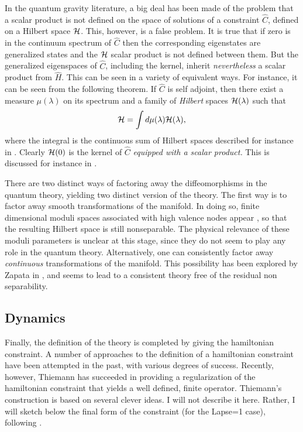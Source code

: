 \documentclass[12pt]{article}
\begin{document}
In the quantum gravity literature, a big deal has been made of 
the problem that a scalar product is not defined on the space of 
solutions of a constraint $\hat C$, defined on a Hilbert space $\cal 
H$.  This, however, is a false problem.  It is true that if zero 
is in the continuum spectrum of $\hat C$ then the corresponding 
eigenstates are generalized states and the $\cal H$ scalar 
product is not defined between them.  But the generalized 
eigenspaces of $\hat C$, including the kernel, inherit {\em 
nevertheless\/} a scalar product from $\hat H$.  This can be seen 
in a variety of equivalent ways.  For instance, it can be seen  
from the following theorem.  If $\hat C$ is self adjoint, then 
there exist a measure $\mu(\lambda)$ on its spectrum and a family 
of {\em Hilbert\/} spaces ${\cal H}(\lambda)$ such that
\begin{equation}
	{\cal H} = \int d\mu(\lambda) {\cal H}(\lambda),
\end{equation}
where the integral is the continuous sum of Hilbert spaces 
described for instance in \cite{Guichardet}. Clearly ${\cal 
H}(0)$ is the kernel of $\hat C$ {\em equipped with a scalar 
product.} This is discussed for instance in \cite{RovelliTh}. 

There are two distinct ways of factoring away the diffeomorphisms 
in the quantum theory, yielding two distinct version of the 
theory.  The first way is to factor away smooth transformations of 
the manifold.  In doing so, finite dimensional moduli spaces 
associated with high valence nodes appear 
\cite{GrottRovelli96}, so that the resulting Hilbert space is still 
nonseparable.  The physical relevance of these moduli parameters 
is unclear at this stage, since they do not seem to play any role 
in the quantum theory.  Alternatively, one can consistently 
factor away {\em continuous\/} transformations of the manifold. 
This possibility has been explored by Zapata in \cite{Zapata,Zapata2}, 
and seems to lead to a consistent theory free of the residual non 
separability. 

\subsection{Dynamics}

Finally, the definition of the theory is completed by giving the 
hamiltonian constraint.  A number of approaches to the definition 
of a hamiltonian constraint have been attempted in the past, with 
various degrees of success.  Recently, however, Thiemann has 
succeeded in providing a regularization of the hamiltonian 
constraint that yields a well defined, finite operator.  
Thiemann's construction \cite{Thiemann96,Thiemann96b,Thiemann96c} 
is based on several clever ideas.  I will not describe it here.  
Rather, I will sketch below the final form of the constraint (for 
the Lapse=1 case), following \cite{Rovelli95b}.
\end{document}

